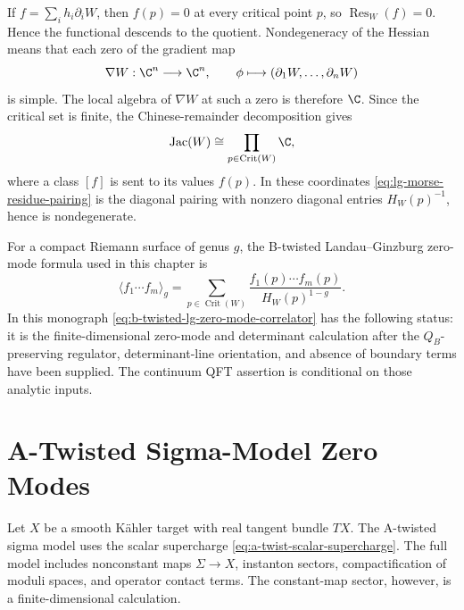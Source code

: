 If \(f=\sum_i h_i\partial_iW\), then \(f(p)=0\) at every critical point
\(p\), so \(\operatorname{Res}_W(f)=0\).  Hence the functional descends to
the quotient.  Nondegeneracy of the Hessian means that each zero of the
gradient map
\[
  \nabla W:\C^n\longrightarrow\C^n,
  \qquad
  \phi\longmapsto(\partial_1W,\ldots,\partial_nW)
\]
is simple.  The local algebra of \(\nabla W\) at such a zero is therefore
\(\C\).  Since the critical set is finite, the Chinese-remainder
decomposition gives
\[
  \operatorname{Jac}(W)\cong
  \prod_{p\in\operatorname{Crit}(W)}\C,
\]
where a class \([f]\) is sent to its values \(f(p)\).  In these coordinates
\eqref{eq:lg-morse-residue-pairing} is the diagonal pairing with nonzero
diagonal entries \(H_W(p)^{-1}\), hence is nondegenerate.

For a compact Riemann surface of genus \(g\), the B-twisted
Landau--Ginzburg zero-mode formula used in this chapter is
\begin{equation}
  \langle f_1\cdots f_m\rangle_g
  =
  \sum_{p\in\operatorname{Crit}(W)}
  \frac{f_1(p)\cdots f_m(p)}
  {H_W(p)^{1-g}}.
  \label{eq:b-twisted-lg-zero-mode-correlator}
\end{equation}
In this monograph \eqref{eq:b-twisted-lg-zero-mode-correlator} has the
following status: it is the finite-dimensional zero-mode and determinant
calculation after the \(Q_B\)-preserving regulator, determinant-line
orientation, and absence of boundary terms have been supplied.  The
continuum QFT assertion is conditional on those analytic inputs.

\section{A-Twisted Sigma-Model Zero Modes}

Let \(X\) be a smooth K\"ahler target with real tangent bundle \(TX\).  The
A-twisted sigma model uses the scalar supercharge
\eqref{eq:a-twist-scalar-supercharge}.  The full model includes nonconstant
maps \(\Sigma\to X\), instanton sectors, compactification of moduli spaces,
and operator contact terms.  The constant-map sector, however, is a
finite-dimensional calculation.

